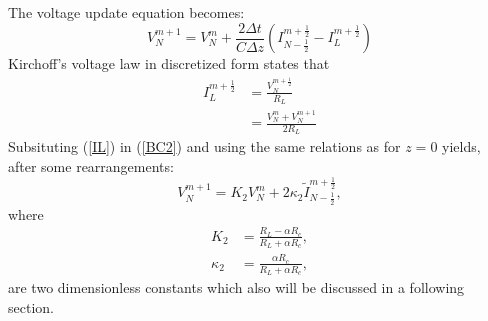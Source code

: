 The voltage update equation becomes:
\begin{equation}
    V^{m+1}_{N} = V^{m}_{N} + \frac{2\Delta t}{C\Delta z}\left(I^{m+\frac{1}{2}}_{N-\frac{1}{2}} - I^{m+\frac{1}{2}}_{L}\right)
    \label{BC2}
\end{equation}
Kirchoff's voltage law in discretized form states that
\begin{align}
    I^{m+\frac{1}{2}}_{L} & = \frac{V^{m+\frac{1}{2}}_{N}}{R_{L}}\nonumber\\
    & = \frac{V^{m}_{N}+V^{m+1}_{N}}{2R_{L}}
    \label{IL}
\end{align}
Subsituting (\ref{IL}) in (\ref{BC2}) and using the same relations as for $z=0$ yields, 
after some rearrangements:
\begin{equation}
    V^{m+1}_{N} = K_{2}V^{m}_N + 2\kappa_{2}\tilde{I}^{m+\frac{1}{2}}_{N-\frac{1}{2}},
\end{equation}
where
\begin{align}
    K_{2} & = \frac{R_{L}-\alpha R_{c}}{R_{L}+\alpha R_{c}},\\
    \kappa_{2} & = \frac{\alpha R_{c}}{R_{L}+\alpha R_{c}},
\end{align}
are two dimensionless constants which also will be discussed in a following section.